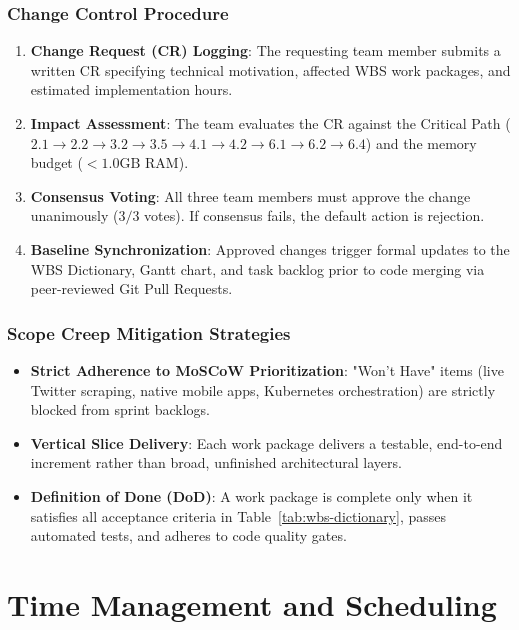 \documentclass[11pt, a4paper]{article}
\begin{document}
\subsubsection{Change Control Procedure}
\begin{enumerate}
  \item \textbf{Change Request (CR) Logging}: The requesting team member submits a written CR specifying technical motivation, affected WBS work packages, and estimated implementation hours.
  \item \textbf{Impact Assessment}: The team evaluates the CR against the Critical Path ($2.1 \to 2.2 \to 3.2 \to 3.5 \to 4.1 \to 4.2 \to 6.1 \to 6.2 \to 6.4$) and the memory budget ($< 1.0\text{GB}$ RAM).
  \item \textbf{Consensus Voting}: All three team members must approve the change unanimously ($3/3$ votes). If consensus fails, the default action is rejection.
  \item \textbf{Baseline Synchronization}: Approved changes trigger formal updates to the WBS Dictionary, Gantt chart, and task backlog prior to code merging via peer-reviewed Git Pull Requests.
\end{enumerate}

\subsubsection{Scope Creep Mitigation Strategies}
\begin{itemize}
  \item \textbf{Strict Adherence to MoSCoW Prioritization}: "Won't Have" items (live Twitter scraping, native mobile apps, Kubernetes orchestration) are strictly blocked from sprint backlogs.
  \item \textbf{Vertical Slice Delivery}: Each work package delivers a testable, end-to-end increment rather than broad, unfinished architectural layers.
  \item \textbf{Definition of Done (DoD)}: A work package is complete only when it satisfies all acceptance criteria in Table~\ref{tab:wbs-dictionary}, passes automated tests, and adheres to code quality gates.
\end{itemize}

\section{Time Management and Scheduling}
\label{sec:time-management}
\end{document}
